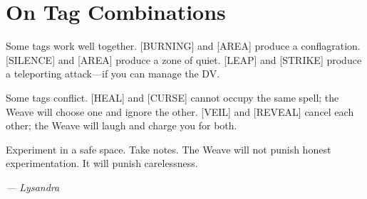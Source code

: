 \section{On Tag Combinations}

Some tags work well together. [BURNING] and [AREA] produce a conflagration. [SILENCE] and [AREA] produce a zone of quiet. [LEAP] and [STRIKE] produce a teleporting attack---if you can manage the DV.

Some tags conflict. [HEAL] and [CURSE] cannot occupy the same spell; the Weave will choose one and ignore the other. [VEIL] and [REVEAL] cancel each other; the Weave will laugh and charge you for both.

Experiment in a safe space. Take notes. The Weave will not punish honest experimentation. It will punish carelessness.

\textit{--- Lysandra}
